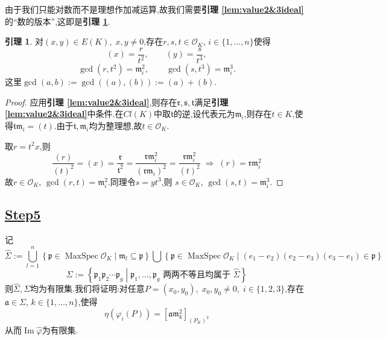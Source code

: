 \documentclass[12pt,A4paper,oneside,reqno]{amsart}
\numberwithin{equation}{section}
\theoremstyle{definition}
\newtheorem{lemma}[theorem]{引理}
\theoremstyle{plain}
\theoremstyle{plain}
\numberwithin{equation}{section}
\theoremstyle{remark}
\DeclareMathOperator{\Img}{\operatorname{Im}}
\newcommand{\MaxSpec}{\operatorname{MaxSpec}}
\begin{document}
由于我们只能对数而不是理想作加减运算,故我们需要\textbf{引理 \ref{lem:value2&3ideal}}的“数的版本”,这即是\textbf{引理 \ref{lem:value2&3number}}.
\begin{lemma}\label{lem:value2&3number}
	对$(x,y) \in E(K), \;x,y\neq 0$,存在$r,s,t \in \mathcal{O}_K$, $i \in \{1,\ldots,n\}$使得
	$$(x)=\frac{r}{t^2}, \qquad (y)=\frac{s}{t^3}, $$
	$$\gcd(r,t^2)=\mathfrak{m}_i^2, \qquad \gcd (s,t^3)=\mathfrak{m}_i^3.$$
	这里$\gcd(a,b):=\gcd((a),(b)):=(a)+(b)$.
\end{lemma}
\begin{proof}
	应用\textbf{引理 \ref{lem:value2&3ideal}},则存在$\mathfrak{r},\mathfrak{s},\mathfrak{t}$满足\textbf{引理 \ref{lem:value2&3ideal}}中条件.在$Cl(K)$中取$\mathfrak{t}$的逆,设代表元为$\mathfrak{m}_i$,则存在$t \in K$,使得$\mathfrak{t}\mathfrak{m}_i=(t)$.由于$\mathfrak{t},\mathfrak{m}_i$均为整理想,故$t \in \mathcal{O}_K$.
	
	取$r=t^2x$,则
	$$\frac{(r)}{(t)^2}=(x)=\frac{\mathfrak{r}}{\mathfrak{t}^2}=\frac{\mathfrak{r}\mathfrak{m}_i^2}{(\mathfrak{r}\mathfrak{m}_i)^2}=\frac{\mathfrak{r}\mathfrak{m}_i^2}{(t)^2} \;\Longrightarrow\; (r)=\mathfrak{r}\mathfrak{m}_i^2$$
	故$r \in \mathcal{O}_K$, $\gcd (r,t)= \mathfrak{m}_i^2$.同理令$s=yt^3$,则 $s \in \mathcal{O}_K$, $\gcd (s,t)= \mathfrak{m}_i^3$.
\end{proof}
\subsection*{\underline{Step5}}
记
$$\hat{\Sigma}:=\bigcup_{l=1}^n\left\{\mathfrak{p} \in \MaxSpec \mathcal{O}_K \middle| \mathfrak{m}_l\subseteq\mathfrak{p} \right\} \bigcup \left\{\mathfrak{p} \in \MaxSpec \mathcal{O}_K \middle| (e_1-e_2)(e_2-e_3)(e_3-e_1) \in \mathfrak{p} \right\}$$
$$\Sigma:=\left\{\mathfrak{p}_1\mathfrak{p}_2\cdots \mathfrak{p}_g  \middle| \mathfrak{p}_1,\ldots ,\mathfrak{p}_g \text{ 两两不等且均属于 }\hat{\Sigma} \right\}$$
则$\hat{\Sigma},\Sigma$均为有限集.我们将证明:对任意$P=(x_0,y_0),\; x_0,y_0 \neq 0,\; i \in \{1,2,3\}$,存在$\mathfrak{a} \in \Sigma$, $k \in \{1,\ldots,n\}$,使得
$$\eta(\varphi_i(P))=\left[\mathfrak{a}\mathfrak{m}_k^2\right]_{(P_K)^2}$$
从而$\Img \hat{\varphi}$为有限集.
\end{document}

